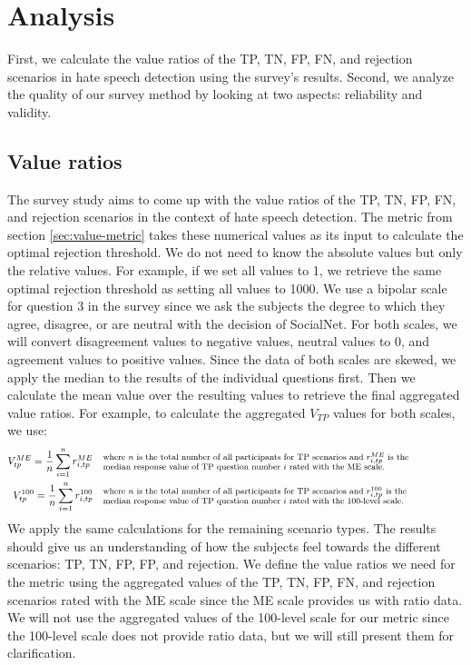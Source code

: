 \section{Analysis}
\label{sec:survey-analysis}
First, we calculate the value ratios of the TP, TN, FP, FN, and rejection scenarios in hate speech detection using the survey's results.
%
Second, we analyze the quality of our survey method by looking at two aspects: reliability and validity.

\subsection{Value ratios}
\label{sec:analysis-values}
The survey study aims to come up with the value ratios of the TP, TN, FP, FN, and rejection scenarios in the context of hate speech detection.
%
The metric from section \ref{sec:value-metric} takes these numerical values as its input to calculate the optimal rejection threshold.
%
We do not need to know the absolute values but only the relative values.
%
For example, if we set all values to 1, we retrieve the same optimal rejection threshold as setting all values to 1000.
%
We use a bipolar scale for question 3 in the survey since we ask the subjects the degree to which they agree, disagree, or are neutral with the decision of SocialNet.
%
For both scales, we will convert disagreement values to negative values, neutral values to 0, and agreement values to positive values.
%
Since the data of both scales are skewed, we apply the median to the results of the individual questions first.
%
Then we calculate the mean value over the resulting values to retrieve the final aggregated value ratios.
%
For example, to calculate the aggregated $V_{TP}$ values for both scales, we use:
\begin{align*}
    V_{tp}^{ME} = \frac{1}{n} \sum_{i=1}^{n} r_{i, tp}^{ME}   & \quad  \parbox{35em}{\footnotesize where $n$ is the total number of all participants for TP scenarios and $r_{i, tp}^{ME}$ is the  \\median response value of TP question number $i$ rated with the ME scale.}\\
    V_{tp}^{100} = \frac{1}{n} \sum_{i=1}^{n} r_{i, tp}^{100} & \quad  \parbox{35em}{\footnotesize where $n$ is the total number of all participants for TP scenarios and $r_{i, tp}^{100}$ is the \\median response value of TP question number $i$ rated with the 100-level scale.}
\end{align*}
%
We apply the same calculations for the remaining scenario types.
%
The results should give us an understanding of how the subjects feel towards the different scenarios: TP, TN, FP, FP, and rejection.
%
We define the value ratios we need for the metric using the aggregated values of the TP, TN, FP, FN, and rejection scenarios rated with the ME scale since the ME scale provides us with ratio data.
%
We will not use the aggregated values of the 100-level scale for our metric since the 100-level scale does not provide ratio data, but we will still present them for clarification.

